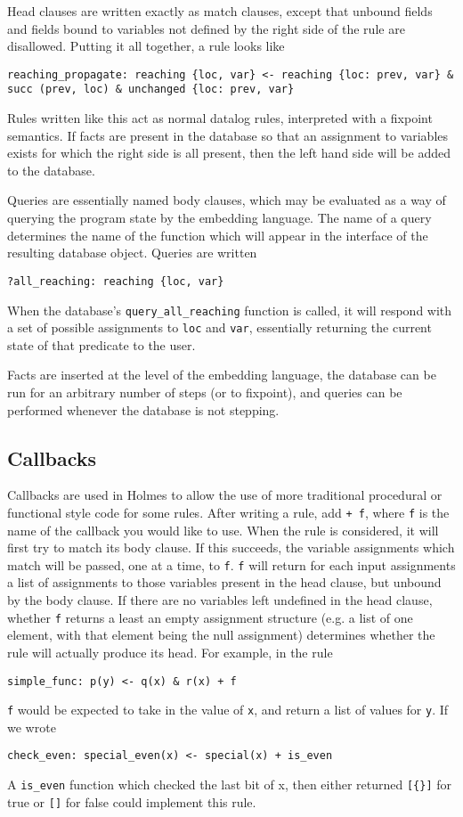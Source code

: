 Head clauses are written exactly as match clauses, except that unbound fields and fields bound to variables not defined by the right side of the rule are disallowed.
Putting it all together, a rule looks like
\begin{verbatim}
reaching_propagate: reaching {loc, var} <- reaching {loc: prev, var} & succ (prev, loc) & unchanged {loc: prev, var}
\end{verbatim}
Rules written like this act as normal datalog rules, interpreted with a fixpoint semantics.
If facts are present in the database so that an assignment to variables exists for which the right side is all present, then the left hand side will be added to the database.

Queries are essentially named body clauses, which may be evaluated as a way of querying the program state by the embedding language.
The name of a query determines the name of the function which will appear in the interface of the resulting database object.
Queries are written
\begin{verbatim}
?all_reaching: reaching {loc, var}
\end{verbatim}
When the database's \texttt{query\_all\_reaching} function is called, it will respond with a set of possible assignments to \texttt{loc} and \texttt{var}, essentially returning the current state of that predicate to the user.

Facts are inserted at the level of the embedding language, the database can be run for an arbitrary number of steps (or to fixpoint), and queries can be performed whenever the database is not stepping.

\subsection{Callbacks}
Callbacks are used in Holmes to allow the use of more traditional procedural or functional style code for some rules.
After writing a rule, add \texttt{+ f}, where \texttt{f} is the name of the callback you would like to use.
When the rule is considered, it will first try to match its body clause.
If this succeeds, the variable assignments which match will be passed, one at a time, to \texttt{f}.
\texttt{f} will return for each input assignments a list of assignments to those variables present in the head clause, but unbound by the body clause.
If there are no variables left undefined in the head clause, whether \texttt{f} returns a least an empty assignment structure (e.g. a list of one element, with that element being the null assignment) determines whether the rule will actually produce its head.
For example, in the rule
\begin{verbatim}
simple_func: p(y) <- q(x) & r(x) + f
\end{verbatim}
\texttt{f} would be expected to take in the value of \texttt{x}, and return a list of values for \texttt{y}.
If we wrote
\begin{verbatim}
check_even: special_even(x) <- special(x) + is_even
\end{verbatim}
A \texttt{is_even} function which checked the last bit of x, then either returned \texttt{[\{\}]} for true or \texttt{[]} for false could implement this rule.

